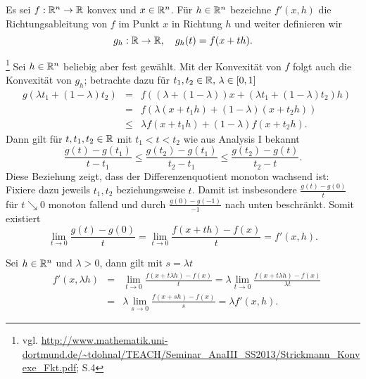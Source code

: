 Es sei $f:\mathbb{R}^n\to \mathbb{R}$ konvex und $x\in \mathbb{R}^n$. Für $h\in \mathbb{R}^n$ bezeichne $f'(x,h)$ die Richtungsableitung von $f$ im Punkt $x$ in Richtung $h$ und
weiter definieren wir 
\begin{displaymath}
 g_h:\mathbb{R}\to\mathbb{R},\quad g_h(t)=f(x+th).
\end{displaymath}

\begin{compactenum}[(i)]
 \item \footnote{vgl. \url{http://www.mathematik.uni-dortmund.de/~tdohnal/TEACH/Seminar\_AnaIII\_SS2013/Strickmann\_Konvexe\_Fkt.pdf}; S.4}
 Sei $h\in\mathbb{R}^n$ beliebig aber fest gewählt. Mit der Konvexität von $f$ folgt auch die Konvexität von $g_h$;
 betrachte dazu für $t_1,t_2\in \mathbb{R}, \, \lambda\in[0,1]$
 \begin{align*}
  &g(\lambda t_1+(1-\lambda)t_2)&=& f((\lambda+(1-\lambda))x+(\lambda t_1+(1-\lambda)t_2)h)\\
  &&=& f(\lambda(x+t_1h)+(1-\lambda)(x+t_2h))\\
  &&\leq& \lambda f(x+t_1h)+(1-\lambda)f(x+t_2h).
 \end{align*}
 Dann gilt für $t,t_1,t_2\in \mathbb{R}$ mit $t_1<t<t_2$ wie aus Analysis I bekannt
 \begin{displaymath}
  \frac{g(t)-g(t_1)}{t-t_1}\leq\frac{g(t_2)-g(t_1)}{t_2-t_1}\leq\frac{g(t_2)-g(t)}{t_2-t}.
 \end{displaymath}
 Diese Beziehung zeigt, dass der Differenzenquotient monoton wachsend ist: Fixiere dazu jeweils $t_1,t_2$ beziehungsweise $t$.
 Damit ist insbesondere $\frac{g(t)-g(0)}{t}$ für $t\searrow0$ monoton fallend und durch $\frac{g(0)-g(-1)}{-1}$ nach unten beschränkt.
 Somit existiert 
 \begin{displaymath}
  \lim_{t\to 0} \frac{g(t)-g(0)}{t}=\lim_{t\to 0}\frac{f(x+th)-f(x)}{t}=f'(x,h).
 \end{displaymath}
 \item Sei $h\in\mathbb{R}^n$ und $\lambda>0$, dann gilt mit $s=\lambda t$
 \begin{align*}
  &f'(x,\lambda h)&=&\lim_{t\to 0}\frac{f(x+t\lambda h)-f(x)}{t}=\lambda\lim_{t\to 0}\frac{f(x+t\lambda h)-f(x)}{\lambda t}\\
  &&=&\lambda\lim_{s\to 0}\frac{f(x+s h)-f(x)}{s}=\lambda f'(x,h).
 \end{align*}

 \item
 \item
\end{compactenum}


